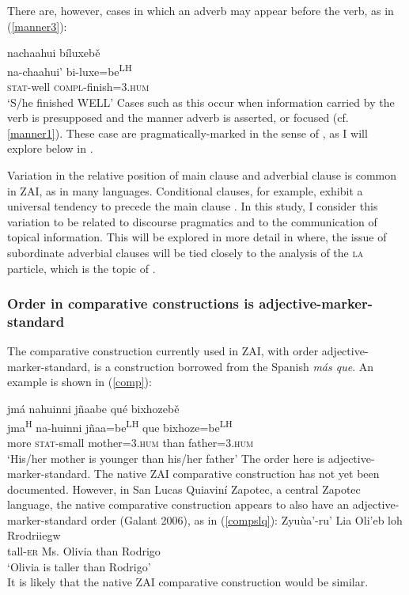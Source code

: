There are, however, cases in which an adverb may appear before the verb, as in (\ref{manner3}):

\ea\label{manner3}
\glll nachaahui b\'{i}luxeb\v{e} \\
na-chaahui' bi-luxe=be\textsuperscript{LH} \\
\textsc{stat}-well \textsc{compl}-finish=\textsc{3.hum} \\
\glt `S/he finished WELL'
\z
Cases such as this occur when information carried by the verb is presupposed and the manner adverb is asserted, or focused (cf. \ref{manner1}). These case are pragmatically-marked in the sense of \citet{payne1995}, as I will explore below in .

Variation in the relative position of main clause and adverbial clause is common in ZAI, as in many languages. Conditional clauses, for example, exhibit a universal tendency to precede the main clause \citep{haiman1978}. In this study, I consider this variation to be related to discourse pragmatics and to the communication of topical information. This will be explored in more detail in  where, the issue of subordinate adverbial clauses will be tied closely to the analysis of the \textsc{la} particle, which is the topic of .


\subsubsection{Order in comparative constructions is adjective-marker-standard}

The comparative construction currently used in ZAI, with order adjective-marker-standard, is a construction borrowed from the Spanish \textit{m\'{a}s que}. An example is shown in (\ref{comp}):

\ea\label{comp}
\glll jm\'{a} nahuinni jñaabe qu\'{e} bixhozeb\v{e} \\
jma\textsuperscript{H} na-huinni jñaa=be\textsuperscript{LH} que bixhoze=be\textsuperscript{LH} \\
more \textsc{stat}-small mother=\textsc{3.hum} than father=\textsc{3.hum} \\
\glt `His/her mother is younger than his/her father'
\z
The order here is adjective-marker-standard. The native ZAI comparative construction has not yet been documented. However, in San Lucas Quiavin\'{i} Zapotec, a central Zapotec language, the native comparative construction appears to also have an adjective-marker-standard order (Galant 2006), as in (\ref{compslq}):
\ea\label{compslq}
\gll Zyu\`{u}a'-ru' Lia Oli'eb loh Rrodriiegw \\
tall-\textsc{er} Ms. Olivia than Rodrigo \\
\glt `Olivia is taller than Rodrigo' \\
\z
It is likely that the native ZAI comparative construction would be similar.


